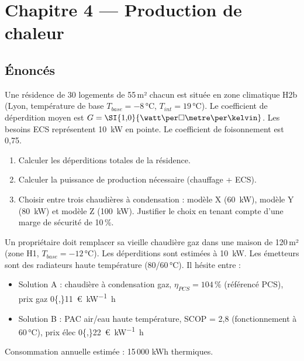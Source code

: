 \chapter*{Chapitre 4 — Production de chaleur}

\section*{Énoncés}


Une résidence de 30 logements de 55\,m² chacun est située en zone climatique H2b (Lyon, température de base $T_{base} = -8$\,°C, $T_{int} = 19$\,°C). Le coefficient de déperdition moyen est $G = \SI{1{,}0}{\watt\per\square\metre\per\kelvin}$. Les besoins ECS représentent \SI{10}{\kilo\watt} en pointe. Le coefficient de foisonnement est 0,75.

\begin{enumerate}
  \item Calculer les déperditions totales de la résidence.
  \item Calculer la puissance de production nécessaire (chauffage + ECS).
  \item Choisir entre trois chaudières à condensation : modèle X (\SI{60}{\kilo\watt}), modèle Y (\SI{80}{\kilo\watt}) et modèle Z (\SI{100}{\kilo\watt}). Justifier le choix en tenant compte d'une marge de sécurité de 10\,\%.
\end{enumerate}



Un propriétaire doit remplacer sa vieille chaudière gaz dans une maison de 120\,m² (zone H1, $T_{base} = -12$\,°C). Les déperditions sont estimées à \SI{10}{\kilo\watt}. Les émetteurs sont des radiateurs haute température (80/60\,°C). Il hésite entre :
\begin{itemize}
  \item Solution A : chaudière à condensation gaz, $\eta_{PCS} = 104\,\%$ (référencé PCS), prix gaz \SI{0{,}11}{\euro\per\kilo\watt\hour}
  \item Solution B : PAC air/eau haute température, SCOP = 2,8 (fonctionnement à 60\,°C), prix élec \SI{0{,}22}{\euro\per\kilo\watt\hour}
\end{itemize}
Consommation annuelle estimée : 15\,000 kWh thermiques.

